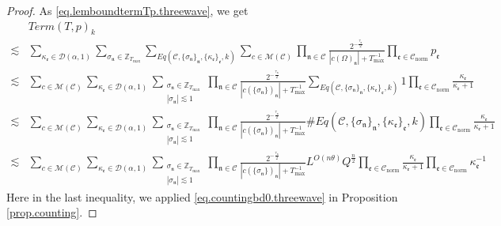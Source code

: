 \begin{proof}
As \eqref{eq.lemboundtermTp.threewave}, we get
\begin{equation}\label{eq.lemboundtermTpop.threewave}
\begin{split}
    &Term(T, p)_k
    \\
    \lesssim& \sum_{\kappa_{\mathfrak{e}}\in \mathcal{D}(\alpha,1)}\sum_{\sigma_{\mathfrak{n}}\in \mathbb{Z}_{T_{\text{max}}}}\sum_{Eq(\mathcal{C}, \{\sigma_{\mathfrak{n}}\}_{\mathfrak{n}}, \{\kappa_{\mathfrak{e}}\}_{\mathfrak{e}},k)} \sum_{c\in \mathscr{M}(\mathcal{C}) }\prod_{\mathfrak{n}\in \mathcal{C}}\frac{2^{-\frac{\tau_{\mathfrak{n}}}{2}}}{|c(\Omega)_{\mathfrak{n}}|+T^{-1}_{\text{max}}} \prod_{\mathfrak{e}\in \mathcal{C}_{\text{norm}}} p_{\mathfrak{e}}
    \\
    \lesssim &\sum_{c\in \mathscr{M}(\mathcal{C}) }\sum_{\kappa_{\mathfrak{e}}\in \mathcal{D}(\alpha,1)}\sum_{\substack{\sigma_{\mathfrak{n}}\in \mathbb{Z}_{T_{\text{max}}}\\ |\sigma_{\mathfrak{n}}|\lesssim 1}}\prod_{\mathfrak{n}\in \mathcal{C}}\frac{2^{-\frac{\tau_{\mathfrak{n}}}{2}}}{|c(\{\sigma_{\mathfrak{n}}\})_{\mathfrak{n}}|+T^{-1}_{\text{max}}} \sum_{Eq(\mathcal{C}, \{\sigma_{\mathfrak{n}}\}_{\mathfrak{n}}, \{\kappa_{\mathfrak{e}}\}_{\mathfrak{e}},k)} 1 \prod_{\mathfrak{e}\in \mathcal{C}_{\text{norm}}} \frac{\kappa_{\mathfrak{e}}}{\kappa_{\mathfrak{e}}+1}
    \\
    \lesssim &\sum_{c\in \mathscr{M}(\mathcal{C}) }\sum_{\kappa_{\mathfrak{e}}\in \mathcal{D}(\alpha,1)}\sum_{\substack{\sigma_{\mathfrak{n}}\in \mathbb{Z}_{T_{\text{max}}}\\ |\sigma_{\mathfrak{n}}|\lesssim 1}}\prod_{\mathfrak{n}\in \mathcal{C}}\frac{2^{-\frac{\tau_{\mathfrak{n}}}{2}}}{|c(\{\sigma_{\mathfrak{n}}\})_{\mathfrak{n}}|+T^{-1}_{\text{max}}} \#Eq(\mathcal{C}, \{\sigma_{\mathfrak{n}}\}_{\mathfrak{n}}, \{\kappa_{\mathfrak{e}}\}_{\mathfrak{e}},k) \prod_{\mathfrak{e}\in \mathcal{C}_{\text{norm}}} \frac{\kappa_{\mathfrak{e}}}{\kappa_{\mathfrak{e}}+1}
    \\
    \lesssim &\sum_{c\in \mathscr{M}(\mathcal{C}) }\sum_{\kappa_{\mathfrak{e}}\in \mathcal{D}(\alpha,1)}\sum_{\substack{\sigma_{\mathfrak{n}}\in \mathbb{Z}_{T_{\text{max}}}\\ |\sigma_{\mathfrak{n}}|\lesssim 1}}\prod_{\mathfrak{n}\in \mathcal{C}}\frac{2^{-\frac{\tau_{\mathfrak{n}}}{2}}}{|c(\{\sigma_{\mathfrak{n}}\})_{\mathfrak{n}}|+T^{-1}_{\text{max}}} L^{O(n\theta)} Q^{\frac{n}{2}} \prod_{\mathfrak{e}\in \mathcal{C}_{\text{norm}}} \frac{\kappa_{\mathfrak{e}}}{\kappa_{\mathfrak{e}}+1} \prod_{\mathfrak{e}\in \mathcal{C}_{\text{norm}}} \kappa_{\mathfrak{e}}^{-1}
\end{split}
\end{equation}
Here in the last inequality, we applied \eqref{eq.countingbd0.threewave} in Proposition \ref{prop.counting}.


\end{proof}
